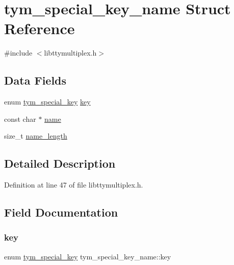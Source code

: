 \hypertarget{structtym__special__key__name}{}\section{tym\+\_\+special\+\_\+key\+\_\+name Struct Reference}
\label{structtym__special__key__name}


{\ttfamily \#include $<$libttymultiplex.\+h$>$}

\subsection*{Data Fields}
\begin{DoxyCompactItemize}
\item 
enum \hyperlink{libttymultiplex_8h_abc86b175aee7ad5c631cdc10ff2025ac}{tym\+\_\+special\+\_\+key} \hyperlink{structtym__special__key__name_aebd783edb2f7d1252e28e7f1456d0757}{key}
\item 
const char $\ast$ \hyperlink{structtym__special__key__name_a9a82b9fd28fae482c836f959ca5a848b}{name}
\item 
size\+\_\+t \hyperlink{structtym__special__key__name_a6d6587d1d107252a68c6d9ab753d3ea6}{name\+\_\+length}
\end{DoxyCompactItemize}


\subsection{Detailed Description}


Definition at line 47 of file libttymultiplex.\+h.



\subsection{Field Documentation}
\mbox{\label{structtym__special__key__name_aebd783edb2f7d1252e28e7f1456d0757}} 
\subsubsection{\texorpdfstring{key}{key}}
{\footnotesize\ttfamily enum \hyperlink{libttymultiplex_8h_abc86b175aee7ad5c631cdc10ff2025ac}{tym\+\_\+special\+\_\+key} tym\+\_\+special\+\_\+key\+\_\+name\+::key}



